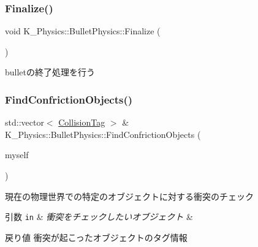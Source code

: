 \subsubsection{\texorpdfstring{Finalize()}{Finalize()}}
{\footnotesize\ttfamily void K\+\_\+\+Physics\+::\+Bullet\+Physics\+::\+Finalize (\begin{DoxyParamCaption}{ }\end{DoxyParamCaption})}



bulletの終了処理を行う 

\mbox{\label{class_k___physics_1_1_bullet_physics_ade016d6e87e8dfdcc8d559455a161692}} 
\subsubsection{\texorpdfstring{Find\+Confriction\+Objects()}{FindConfrictionObjects()}}
{\footnotesize\ttfamily std\+::vector$<$ \mbox{\hyperlink{struct_k___physics_1_1_collision_tag}{Collision\+Tag}} $>$ \& K\+\_\+\+Physics\+::\+Bullet\+Physics\+::\+Find\+Confriction\+Objects (\begin{DoxyParamCaption}\item[{bt\+Collision\+Object $\ast$}]{myself }\end{DoxyParamCaption})}



現在の物理世界での特定のオブジェクトに対する衝突のチェック 


\begin{DoxyParams}[1]{引数}
\mbox{\tt in}  & {\em 衝突をチェックしたいオブジェクト} & \\
\hline
\end{DoxyParams}
\begin{DoxyReturn}{戻り値}
衝突が起こったオブジェクトのタグ情報 
\end{DoxyReturn}
\mbox{\label{class_k___physics_1_1_bullet_physics_ad280b1eeb62f13463d47be6182d5b978}} 
